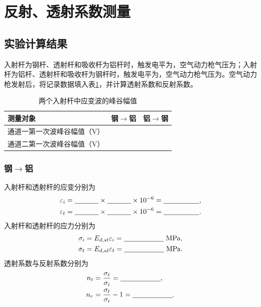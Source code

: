 \documentclass[UTF8,a4paper,12pt]{ctexart}
\newcommand{\blank}[1][2.5cm]{\mbox{\underline{\hspace{#1}}}}
\numberwithin{equation}{section}
\begin{document}
\section{反射、透射系数测量}
\subsection{实验计算结果}
入射杆为钢杆、透射杆和吸收杆为铝杆时，触发电平为\blank[2cm]，空气动力枪气压为\blank[2cm]；入射杆为铝杆、透射杆和吸收杆为钢杆时，触发电平为\blank[2cm]，空气动力枪气压为\blank[2cm]。空气动力枪发射后，将记录数据填入表\ref{tab:exp1-amplitude}，并计算透射系数和反射系数。

\begin{table}[H]
\centering
\caption{两个入射杆中应变波的峰谷幅值}
\label{tab:exp1-amplitude}
\begin{tabular}{lcc}
\toprule
测量对象 & 钢$\rightarrow$铝 & 铝$\rightarrow$钢\\
\midrule
通道一第一次波峰谷幅值（V） & \blank[2cm] & \blank[2cm]\\
通道二第一次波峰谷幅值（V） & \blank[2cm] & \blank[2cm]\\
\bottomrule
\end{tabular}
\end{table}

\subsubsection{钢\texorpdfstring{$\rightarrow$}{→}铝}
入射杆和透射杆的应变分别为
\begin{subequations}
\begin{align}
  \varepsilon_i&=\blank[1.2cm]\times\blank[1.2cm]\times10^{-6}=\blank[1.8cm],\\
  \varepsilon_t&=\blank[1.2cm]\times\blank[1.2cm]\times10^{-6}=\blank[1.8cm].
\end{align}
\end{subequations}
入射杆和透射杆的应力分别为
\begin{subequations}
\begin{align}
  \sigma_i&=E_{d,st}\varepsilon_i=\blank[2cm]\ \mathrm{MPa},\\
  \sigma_t&=E_{d,al}\varepsilon_t=\blank[2cm]\ \mathrm{MPa}.
\end{align}
\end{subequations}
透射系数与反射系数分别为
\begin{subequations}
\begin{align}
  n_t&=\frac{\sigma_t}{\sigma_i}=\blank[2cm],\\
  n_r&=\frac{\sigma_t}{\sigma_i}-1=\blank[2cm].
\end{align}
\end{subequations}
\end{document}
